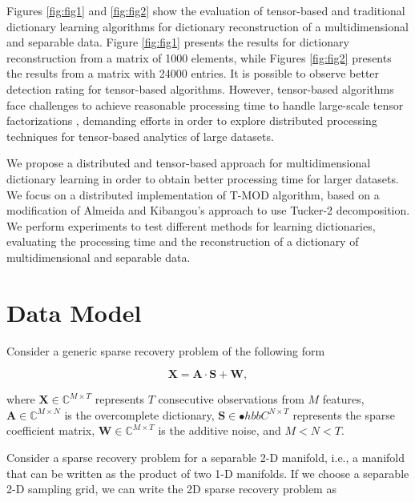 \documentclass[conference]{IEEEtran}
\begin{document}
Figures \ref{fig:fig1} and \ref{fig:fig2} show the evaluation of tensor-based and traditional dictionary learning algorithms for dictionary reconstruction of a multidimensional and separable data. Figure \ref{fig:fig1} presents the results for dictionary reconstruction from a matrix of 1000 elements, while Figures \ref{fig:fig2} presents the results from a matrix with 24000 entries. It is possible to observe better detection rating for tensor-based algorithms. However, tensor-based algorithms face challenges to achieve reasonable processing time to handle large-scale tensor factorizations \cite{de2014distributed}, demanding efforts in order to explore distributed processing techniques for tensor-based analytics of large datasets.

We propose a distributed and tensor-based approach for multidimensional dictionary learning in order to obtain better processing time for larger datasets. We focus on a distributed implementation of T-MOD \cite{roemer2014tensor} algorithm, based on a modification of Almeida and Kibangou's \cite{de2014distributed} approach to use Tucker-2 decomposition. We perform experiments to test different methods for learning dictionaries, evaluating the processing time and the reconstruction of a dictionary of multidimensional and separable data.

\section{Data Model}

Consider a generic sparse recovery problem of the following form

\begin{equation}\label{eq:eq01}
\boldsymbol{X} = \boldsymbol{A} \cdot \boldsymbol{S} + \boldsymbol{W},
\end{equation}

where $\boldsymbol{X} \in \mathbb{C}^{M \times T}$ represents $T$ consecutive observations from $M$ features, $\boldsymbol{A} \in \mathbb{C}^{M \times N}$ is the overcomplete dictionary, $\boldsymbol{S} \in \mathbb{•}hbb{C}^{N \times T}$ represents the sparse coefficient matrix, $\boldsymbol{W} \in \mathbb{C}^{M \times T}$ is the additive noise, and $M < N < T$.

Consider a sparse recovery problem for a separable 2-D manifold, i.e., a manifold that can be written as the product of two 1-D manifolds. If we choose a separable 2-D sampling grid, we can write the 2D sparse recovery problem as
\end{document}
